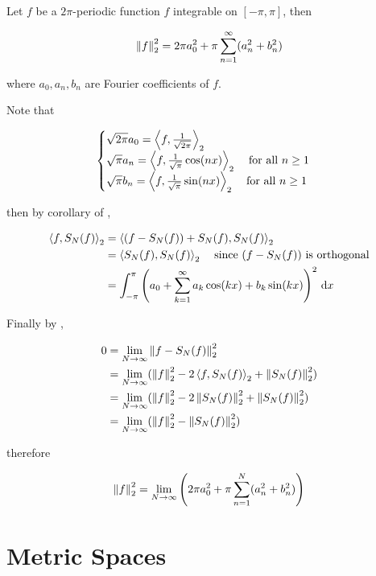 \documentclass[a4paper,12pt]{article}
\begin{document}
\begin{pst}
  Let $f$ be a $2\pi$-periodic function $f$ integrable on $[-\pi,\pi]$, then

  $$\left\| f\right\|_{2}^{2}=2\pi a_{0}^{2}+\pi\sum_{n=1}^{\infty}(a_{n}^{2}+b_{n}^{2})$$\s

  where $a_{0},a_{n},b_{n}$ are Fourier coefficients of $f$.\n

  \prf Note that

  $$\begin{cases}
    \sqrt{2\pi}a_{0}=\left\langle f,\frac{1}{\sqrt{2\pi}}\right\rangle_{2}\\
    \sqrt{\pi}a_{n}=\left\langle f,\frac{1}{\sqrt{\pi}}\cos(nx)\right\rangle_{2}\;\;\;\;\text{for all }n\geq 1\\
    \sqrt{\pi}b_{n}=\left\langle f,\frac{1}{\sqrt{\pi}}\sin(nx)\right\rangle_{2}\;\;\;\;\text{for all }n\geq 1
  \end{cases}$$\s

  then by corollary of \rpst[\sctd{2}],

  $$\begin{aligned}[t]
    \left\langle f,S_{N}(f)\right\rangle_{2}&=\left\langle (f-S_{N}(f))+S_{N}(f),S_{N}(f)\right\rangle_{2}\\
    &=\left\langle S_{N}(f),S_{N}(f)\right\rangle_{2}\;\;\;\;\text{since }(f-S_{N}(f))\text{ is orthogonal}\\
    &=\int_{-\pi}^{\pi}\left( a_{0}+\sum_{k=1}^{\infty}a_{k}\cos(kx)+b_{k}\sin(kx)\right)^{2}\,\mathrm{d} x
  \end{aligned}$$\s

  Finally by \rthm[\sctd{1}],

  $$\begin{aligned}[t]
    0&=\lim_{N\to\infty}\left\| f-S_{N}(f)\right\|_{2}^{2}\\
    &=\lim_{N\to\infty}(\left\| f\right\|_{2}^{2}-2\left\langle f,S_{N}(f)\right\rangle_{2}+\left\| S_{N}(f)\right\|_{2}^{2})\\
    &=\lim_{N\to\infty}(\left\| f\right\|_{2}^{2}-2\left\| S_{N}(f)\right\|_{2}^{2}+\left\| S_{N}(f)\right\|_{2}^{2})\\
    &=\lim_{N\to\infty}(\left\| f\right\|_{2}^{2}-\left\| S_{N}(f)\right\|_{2}^{2})
  \end{aligned}$$\s

  therefore

  $$\left\| f\right\|_{2}^{2}=\lim_{N\to\infty}\left( 2\pi a_{0}^{2}+\pi\sum_{n=1}^{N}(a_{n}^{2}+b_{n}^{2})\right)$$
\end{pst}

\pagebreak

\section{Metric Spaces}
\end{document}
